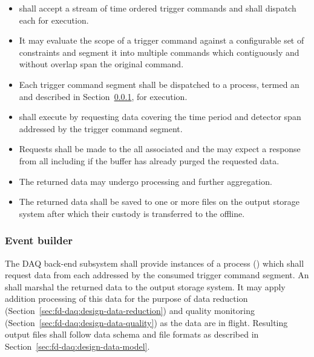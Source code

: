 \begin{itemize}
\item {} shall accept a stream of time ordered trigger commands and shall dispatch each for execution.
\item It may evaluate the scope of a trigger command against a configurable set of constraints and segment it into multiple commands which contiguously and without overlap span the original command.
\item Each trigger command segment shall be dispatched to a process, termed an  and described in Section~\ref{sec:fd-daq:design-event-builder}, for execution.
\item {} shall execute by requesting data covering the time period and detector span addressed by the trigger command segment.
\item Requests shall be made to the all associated  and the  may expect a response from all including if the buffer has already purged the requested data.
\item The returned data may undergo processing and further aggregation.
\item The returned data shall be saved to one or more files on the output storage system after which their custody is transferred to the offline.
\end{itemize}



\subsubsection{Event builder}
\label{sec:fd-daq:design-event-builder}


The DAQ back-end subsystem shall provide instances of a process () which shall request data from each  addressed by the consumed trigger command segment.  An  shall marshal the returned data to the output storage system.  It may apply addition processing of this data for the purpose of data reduction (Section~\ref{sec:fd-daq:design-data-reduction}) and quality monitoring (Section~\ref{sec:fd-daq:design-data-quality}) as the data are in flight. 
Resulting output files shall follow data schema and file formats as described in Section~\ref{sec:fd-daq:design-data-model}.


